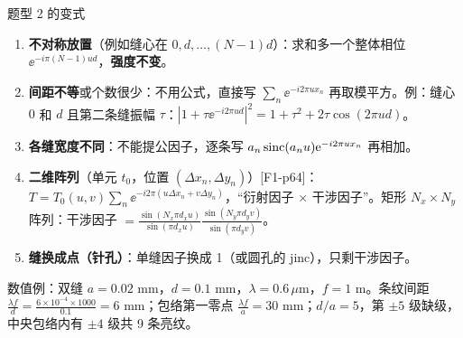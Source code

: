 \begin{recipe}{题型 2 的变式}
\begin{enumerate}
\item \textbf{不对称放置}（例如缝心在 $0,d,\dots,(N-1)d$）：求和多一个整体相位 $\ee^{-i\pi(N-1)ud}$，\textbf{强度不变}。
\item \textbf{间距不等}或个数很少：不用公式，直接写 $\sum_n\ee^{-i2\pi ux_n}$ 再取模平方。例：缝心 $0$ 和 $d$ 且第二条缝振幅 $\tau$：$|1+\tau\ee^{-i2\pi ud}|^2=1+\tau^2+2\tau\cos(2\pi ud)$。
\item \textbf{各缝宽度不同}：不能提公因子，逐条写 $a_n\operatorname{sinc}(a_nu)\mathrm{e}^{-i2\pi ux_n}$ 再相加。
\item \textbf{二维阵列}（单元 $t_0$，位置 $(\Delta x_n,\Delta y_n)$）[F1-p64]：$T=T_0(u,v)\sum_n\ee^{-i2\pi(u\Delta x_n+v\Delta y_n)}$，“衍射因子 × 干涉因子”。矩形 $N_x\times N_y$ 阵列：干涉因子 $=\frac{\sin(N_x\pi d_xu)}{\sin(\pi d_xu)}\frac{\sin(N_y\pi d_yv)}{\sin(\pi d_yv)}$。
\item \textbf{缝换成点（针孔）}：单缝因子换成 1（或圆孔的 jinc），只剩干涉因子。
\end{enumerate}
\end{recipe}

\begin{exam}{数值例：双缝}
$a=0.02$ mm，$d=0.1$ mm，$\lambda=0.6\,\mu$m，$f=1$ m。条纹间距 $\frac{\lambda f}d=\frac{6\times10^{-4}\times1000}{0.1}=6$ mm；包络第一零点 $\frac{\lambda f}{a}=30$ mm；$d/a=5$，第 $\pm5$ 级缺级，中央包络内有 $\pm4$ 级共 9 条亮纹。
\end{exam}


